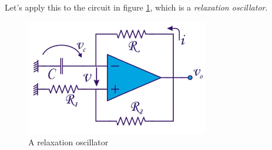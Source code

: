 Let's apply this to the circuit in figure \ref{fig:relaxation3}, which is a \emph{relaxation oscillator}.
\begin{figure}[h!]
	\centering
	\includegraphics[width=8cm]{figures/ch11/relaxation3.jpg}
	\caption{A relaxation oscillator}
	\label{fig:relaxation3}
\end{figure}

